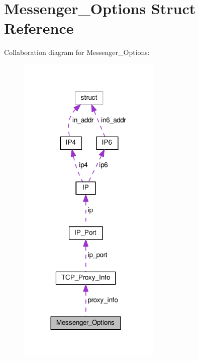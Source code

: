 \hypertarget{struct_messenger___options}{\section{Messenger\+\_\+\+Options Struct Reference}
\label{struct_messenger___options}
}


Collaboration diagram for Messenger\+\_\+\+Options\+:\nopagebreak
\begin{figure}[H]
\begin{center}
\leavevmode
\includegraphics[width=192pt]{struct_messenger___options__coll__graph}
\end{center}
\end{figure}
